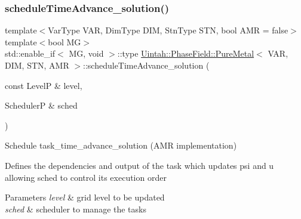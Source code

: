 \subsubsection{\texorpdfstring{schedule\+Time\+Advance\+\_\+solution()}{scheduleTimeAdvance\_solution()}\hspace{0.1cm}{\footnotesize\ttfamily [2/2]}}
{\footnotesize\ttfamily template$<$Var\+Type V\+AR, Dim\+Type D\+IM, Stn\+Type S\+TN, bool A\+MR = false$>$ \\
template$<$bool MG$>$ \\
std\+::enable\+\_\+if$<$ MG, void $>$\+::type \hyperlink{classUintah_1_1PhaseField_1_1PureMetal}{Uintah\+::\+Phase\+Field\+::\+Pure\+Metal}$<$ V\+AR, D\+IM, S\+TN, A\+MR $>$\+::schedule\+Time\+Advance\+\_\+solution (\begin{DoxyParamCaption}\item[{const LevelP \&}]{level,  }\item[{SchedulerP \&}]{sched }\end{DoxyParamCaption})\hspace{0.3cm}{\ttfamily [protected]}}



Schedule task\+\_\+time\+\_\+advance\+\_\+solution (A\+MR implementation) 

Defines the dependencies and output of the task which updates psi and u allowing sched to control its execution order


\begin{DoxyParams}{Parameters}
{\em level} & grid level to be updated \\
\hline
{\em sched} & scheduler to manage the tasks \\
\hline
\end{DoxyParams}
\mbox{\label{classUintah_1_1PhaseField_1_1PureMetal_a343b51c59a68cb107d449d16f4857c1e}} 
